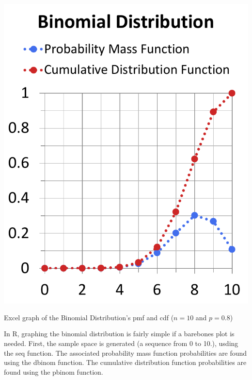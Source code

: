 \documentclass[nohyper,justified,marginals=raggedright]{tufte-book}\usepackage[]{graphicx}\usepackage[]{color}
\makeatletter
\def\maxwidth{ %
  \ifdim\Gin@nat@width>\linewidth
    \linewidth
  \else
    \Gin@nat@width
  \fi
}
\makeatother
\begin{document}
\begin{marginfigure}
\centering
\includegraphics[width=\maxwidth]{BinomialDistribution} 
\caption{Excel graph of the Binomial Distribution's pmf and cdf ($n=10$ and $p=0.8$)}
\label{fig:BinomialDist}
\end{marginfigure}

In R, graphing the binomial distribution is fairly simple if a barebones plot is needed. First, the sample space is generated (a sequence from 0 to 10.), usding the \textsf{seq} function. The associated probability mass function probabilities are found using the \textsf{dbinom} function. The cumulative distribution function probabilities are found using the \textsf{pbinom} function.
\end{document}
